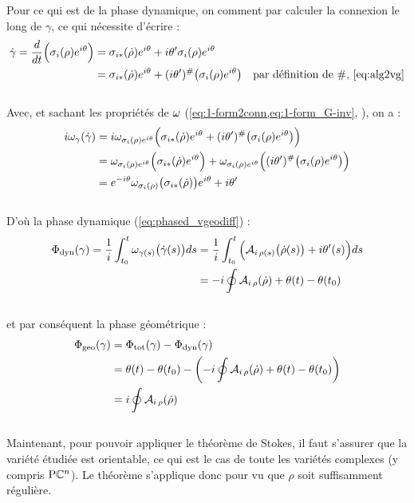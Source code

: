 Pour ce qui est de la phase dynamique, on comment par calculer la connexion le long de $\gamma$, ce qui nécessite d'écrire :
\begin{align*}
	\dot{\gamma} = \frac{d}{dt} \Big( \sigma_i(\rho) e^{i\theta} \Big) &=  \sigma_{i*}(\dot{\rho}) e^{i\theta} + i\theta' \sigma_i(\rho) e^{i\theta} \\
	&= \sigma_{i*}(\dot{\rho}) e^{i\theta} + (i\theta')^\#\big(\sigma_i(\rho) e^{i\theta}\big)  & \text{par définition de $\#$, \cref{eq:alg2vg}}
\end{align*}
\\
Avec, et sachant les propriétés de $\omega$ (\cref{eq:1-form2conn,eq:1-form_G-inv}, ), on a :
\begin{align*}
	i\omega_\gamma(\dot{\gamma}) &= i\omega_{\sigma_i(\rho) e^{i\theta}} \Big( \sigma_{i*}(\dot{\rho}) e^{i\theta} + (i\theta')^\#\big(\sigma_i(\rho) e^{i\theta}\big) \Big) \\
	&= \omega_{\sigma_i(\rho) e^{i\theta}} \Big( \sigma_{i*}(\dot{\rho}) e^{i\theta} \Big) + \omega_{\sigma_i(\rho) e^{i\theta}} \Big((i\theta')^\#\big(\sigma_i(\rho) e^{i\theta}\big) \Big) \\
	&= e^{-i\theta} \omega_{\sigma_i(\rho)} \big( \sigma_{i*}(\dot{\rho}) \big) e^{i\theta} + i\theta'
\end{align*}
\\
D'où la phase dynamique (\cref{eq:phased_vgeodiff}) :
\begin{align*}
	\Phi_{\text{\normalfont dyn}}(\gamma) = \frac{1}{i}\int_{t_0}^t \omega_{\gamma(s)} \big( \dot{\gamma}(s) \big)ds 
	&= \frac{1}{i}\int_{t_0}^t \Big( \mathcal{A}_{i\, \rho(s)}\big(\dot{\rho}(s) \big) + i\theta'(s)\Big)ds \\
	&= -i \oint \mathcal{A}_{i\, \rho} (\dot{\rho}) + \theta(t) - \theta(t_0)
\end{align*}
\\
et par conséquent la phase géométrique :
\begin{align*}
	\Phi_{\text{\normalfont geo}}(\gamma) &= \Phi_{\text{\normalfont tot}}(\gamma) - \Phi_{\text{\normalfont dyn}}(\gamma) \\
	&= \theta(t) - \theta(t_0) - \left( -i \oint \mathcal{A}_{i\, \rho} (\dot{\rho}) + \theta(t) - \theta(t_0) \right) \\
	&= i \oint \mathcal{A}_{i\, \rho} (\dot{\rho})
\end{align*}
\\

Maintenant, pour pouvoir appliquer le théorème de Stokes, il faut s'assurer que la variété étudiée est orientable, ce qui est le cas de toute les variétés complexes \cite[sec. 8.4.2]{nakahara_geometry_2003} (y compris $\text{\normalfont P}\mathbb{C}^{n}$). Le théorème s'applique donc pour vu que $\rho$ soit suffisamment régulière.


